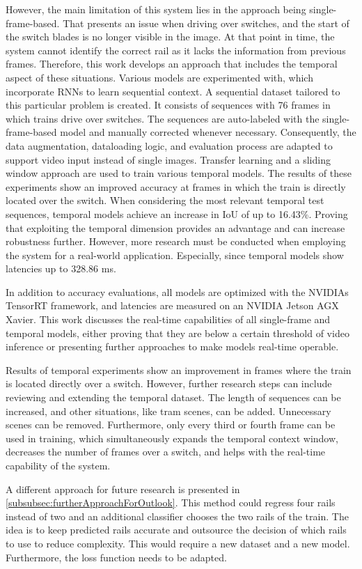However, the main limitation of this system lies in the approach being single-frame-based.
That presents an issue when driving over switches, and the start of the switch blades is no longer visible in the image.
At that point in time, the system cannot identify the correct rail as it lacks the information from previous frames.
Therefore, this work develops an approach that includes the temporal aspect of these situations.
Various models are experimented with, which incorporate \ac{RNN}s to learn sequential context.
A sequential dataset tailored to this particular problem is created.
It consists of sequences with 76 frames in which trains drive over switches.
The sequences are auto-labeled with the single-frame-based model and manually corrected whenever necessary.
Consequently, the data augmentation, dataloading logic, and evaluation process are adapted to support video input instead of single images.
Transfer learning and a sliding window approach are used to train various temporal models.
The results of these experiments show an improved accuracy at frames in which the train is directly located over the switch.
When considering the most relevant temporal test sequences, temporal models achieve an increase in \ac{IoU} of up to 16.43\%.
Proving that exploiting the temporal dimension provides an advantage and can increase robustness further.
However, more research must be conducted when employing the system for a real-world application.
Especially, since temporal models show latencies up to 328.86 ms.

In addition to accuracy evaluations, all models are optimized with the NVIDIAs TensorRT framework, and latencies are measured on an NVIDIA Jetson AGX Xavier.
This work discusses the real-time capabilities of all single-frame and temporal models, either proving that they are below a certain threshold of video inference or presenting further approaches to make models real-time operable.

\vspace{2cm}

\noindent Results of temporal experiments show an improvement in frames where the train is located directly over a switch.
However, further research steps can include reviewing and extending the temporal dataset.
The length of sequences can be increased, and other situations, like tram scenes, can be added.
Unnecessary scenes can be removed.
Furthermore, only every third or fourth frame can be used in training, which simultaneously expands the temporal context window, decreases the number of frames over a switch, and helps with the real-time capability of the system.

A different approach for future research is presented in \autoref{subsubsec:furtherApproachForOutlook}.
This method could regress four rails instead of two and an additional classifier chooses the two rails of the train.
The idea is to keep predicted rails accurate and outsource the decision of which rails to use to reduce complexity.
This would require a new dataset and a new model.
Furthermore, the loss function needs to be adapted.
